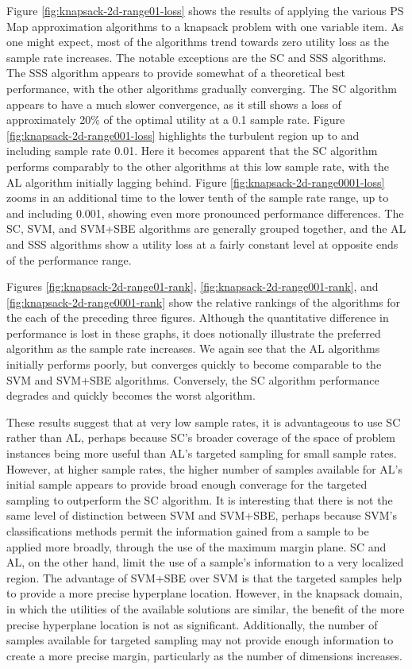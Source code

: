 Figure \ref{fig:knapsack-2d-range01-loss} shows the results of applying the various PS Map approximation algorithms to a knapsack problem with one variable item.  As one might expect, most of the algorithms trend towards zero utility loss as the sample rate increases.  The notable exceptions are the SC and SSS algorithms. The SSS algorithm appears to provide somewhat of a theoretical best performance, with the other algorithms gradually converging.  The SC algorithm appears to have a much slower convergence, as it still shows a loss of approximately 20\% of the optimal utility at a 0.1 sample rate.  Figure \ref{fig:knapsack-2d-range001-loss} highlights the turbulent region up to and including sample rate 0.01.  Here it becomes apparent that the SC algorithm performs comparably to the other algorithms at this low sample rate, with the AL algorithm initially lagging behind.  Figure \ref{fig:knapsack-2d-range0001-loss} zooms in an additional time to the lower tenth of the sample rate range, up to and including 0.001, showing even more pronounced performance differences.  The SC, SVM, and SVM+SBE algorithms are generally grouped together, and the AL and SSS algorithms show a utility loss at a fairly constant level at opposite ends of the performance range.

Figures \ref{fig:knapsack-2d-range01-rank}, \ref{fig:knapsack-2d-range001-rank}, and \ref{fig:knapsack-2d-range0001-rank} show the relative rankings of the algorithms for the each of the preceding three figures.  Although the quantitative difference in performance is lost in these graphs, it does notionally illustrate the preferred algorithm as the sample rate increases.  We again see that the AL algorithms initially performs poorly, but converges quickly to become comparable to the SVM and SVM+SBE algorithms.  Conversely, the SC algorithm performance degrades and quickly becomes the worst algorithm. 

These results suggest that at very low sample rates, it is advantageous to use SC rather than AL, perhaps because SC's broader coverage of the space of problem instances being more useful than AL's targeted sampling for small sample rates.  However, at higher sample rates, the higher number of samples available for AL's initial sample appears to provide broad enough converage for the targeted sampling  to outperform the SC algorithm.  It is interesting that there is not the same level of distinction between SVM and SVM+SBE, perhaps because SVM's classifications methods permit the information gained from a sample to be applied more broadly, through the use of the maximum margin plane.  SC and AL, on the other hand, limit the use of a sample's information to a very localized region.  The advantage of SVM+SBE over SVM is that the targeted samples help to provide a more precise hyperplane location.  However, in the knapsack domain, in which the utilities of the available solutions are similar,  the benefit of the more precise hyperplane location is not as significant.  Additionally, the number of samples available for targeted sampling may not provide enough information to create a more precise margin, particularly as the number of dimensions increases.



